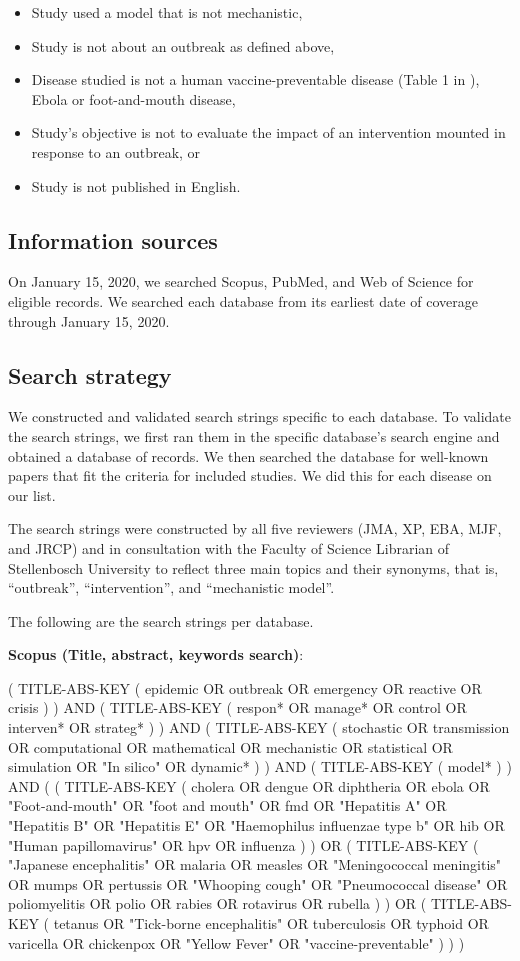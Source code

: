 \documentclass[10pt,letterpaper]{article}
\begin{document}
\begin{itemize}
	\item Study used a model that is not mechanistic,
	\item Study is not about an outbreak as defined above,
	\item Disease studied is not a human vaccine-preventable disease (Table 1 in ), Ebola or foot-and-mouth disease,
	\item Study's objective is not to evaluate the impact of an intervention mounted in response to an outbreak, or
	\item Study is not published in English.
\end{itemize}

\subsection*{Information sources}
On January 15, 2020, we searched Scopus, PubMed, and Web of Science for eligible records. We searched each database from its earliest date of coverage through January 15, 2020. 

\subsection*{Search strategy}
We constructed and validated search strings specific to each database. To validate the search strings, we first ran them in the specific database's search engine and obtained a database of records. We then searched the database for well-known papers that fit the criteria for included studies. We did this for each disease on our list. 

The search strings were constructed by all five reviewers (JMA, XP, EBA, MJF, and JRCP) and in consultation with the Faculty of Science Librarian of Stellenbosch University to reflect three main topics and their synonyms, that is, ``outbreak'', ``intervention'', and ``mechanistic model''. 

The following are the search strings per database. 

\textbf{Scopus (Title, abstract, keywords search)}:

( TITLE-ABS-KEY ( epidemic  OR  outbreak  OR  emergency  OR  reactive  OR  crisis ) )  AND  ( TITLE-ABS-KEY ( respon*  OR  manage*  OR  control  OR  interven*  OR  strateg* ) )  AND  ( TITLE-ABS-KEY ( stochastic  OR  transmission  OR  computational  OR  mathematical  OR  mechanistic  OR  statistical  OR  simulation  OR  "In silico"  OR  dynamic* ) )  AND  ( TITLE-ABS-KEY ( model* ) )  AND  ( ( TITLE-ABS-KEY ( cholera  OR  dengue  OR  diphtheria  OR  ebola  OR  "Foot-and-mouth"  OR  "foot and mouth"  OR  fmd  OR  "Hepatitis A"  OR  "Hepatitis B"  OR  "Hepatitis E"  OR  "Haemophilus influenzae type b"  OR  hib  OR  "Human papillomavirus"  OR  hpv  OR  influenza ) )  OR  ( TITLE-ABS-KEY ( "Japanese encephalitis"  OR  malaria  OR  measles  OR  "Meningococcal meningitis"  OR  mumps  OR  pertussis  OR  "Whooping cough"  OR  "Pneumococcal disease"  OR  poliomyelitis  OR  polio  OR  rabies  OR  rotavirus  OR  rubella ) )  OR  ( TITLE-ABS-KEY ( tetanus  OR  "Tick-borne encephalitis"  OR  tuberculosis  OR  typhoid  OR  varicella  OR  chickenpox  OR  "Yellow Fever"  OR  "vaccine-preventable" ) ) )
\end{document}
